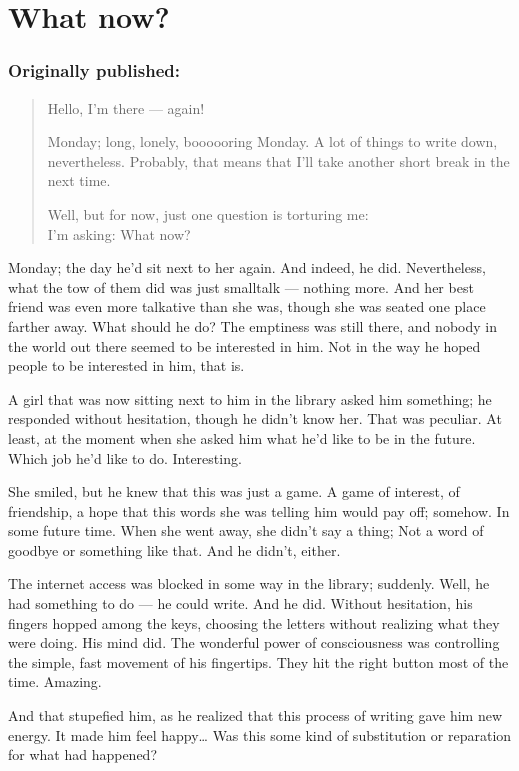 \chapter{What now?}
\label{cha:what-now}
\subsection*{Originally published: }
\begin{quote}
Hello, I'm there --- again!

Monday; long, lonely, boooooring Monday. 
A lot of things to write down, nevertheless. 
Probably, that means that I'll take another short break in the next time. 

Well, but for now, just one question is torturing me:\\
I'm asking: What now?
\end{quote}

Monday; the day he'd sit next to her again. And indeed, he did. Nevertheless, what the tow of them did was just smalltalk --- nothing more. 
And her best friend was even more talkative than she was, though she was seated one place farther away. 
What should he do? The emptiness was still there, and nobody in the world out there seemed to be interested in him. 
Not in the way he hoped people to be interested in him, that is.

A girl that was now sitting next to him in the library asked him something; he responded without hesitation, though he didn't know her. 
That was peculiar. 
At least, at the moment when she asked him what he'd like to be in the future. 
Which job he'd like to do. 
Interesting.

She smiled, but he knew that this was just a game. A game of interest, of friendship, a hope that this words she was telling him would pay off; somehow. 
In some future time. 
When she went away, she didn't say a thing; Not a word of goodbye or something like that. 
And he didn't, either.

The internet access was blocked in some way in the library; suddenly. Well, he had something to do --- he could write. And he did. 
Without hesitation, his fingers hopped among the keys, choosing the letters without realizing what they were doing. 
His mind did. The wonderful power of consciousness was controlling the simple, fast movement of his fingertips. 
They hit the right button most of the time. 
Amazing.

And that stupefied him, as he realized that this process of writing gave him new energy. It made him feel happy\ldots
Was this some kind of substitution or reparation for what had happened?


